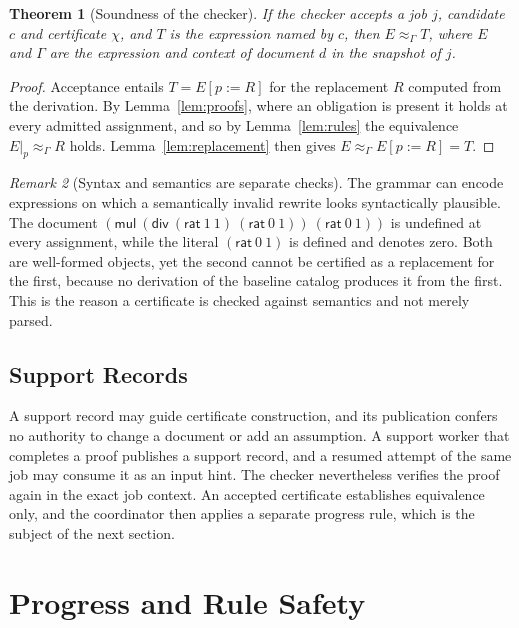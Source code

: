 \documentclass[11pt,a4paper]{article}
\theoremstyle{plain}
\newtheorem{theorem}{Theorem}[section]
\theoremstyle{definition}
\theoremstyle{remark}
\newtheorem{remark}[theorem]{Remark}
\theoremstyle{definition}
\newcommand{\eqv}[1]{\approx_{#1}}
\newcommand{\replace}[3]{#1[#2 \mathbin{:=} #3]}
\begin{document}
\begin{theorem}[Soundness of the checker]
\label{thm:checker}
If the checker accepts a job $j$, candidate $c$ and certificate $\chi$, and $T$ is the expression named by $c$, then $E \eqv{\Gamma} T$, where $E$ and $\Gamma$ are the expression and context of document $d$ in the snapshot of $j$.
\end{theorem}

\begin{proof}
Acceptance entails $T = \replace{E}{p}{R}$ for the replacement $R$ computed from the derivation. By Lemma~\ref{lem:proofs}, where an obligation is present it holds at every admitted assignment, and so by Lemma~\ref{lem:rules} the equivalence $E|_p \eqv{\Gamma} R$ holds. Lemma~\ref{lem:replacement} then gives $E \eqv{\Gamma} \replace{E}{p}{R} = T$.
\end{proof}

\begin{remark}[Syntax and semantics are separate checks]
The grammar can encode expressions on which a semantically invalid rewrite looks syntactically plausible. The document $(\mathsf{mul}\ (\mathsf{div}\ (\mathsf{rat}\ 1\ 1)\ (\mathsf{rat}\ 0\ 1))\ (\mathsf{rat}\ 0\ 1))$ is undefined at every assignment, while the literal $(\mathsf{rat}\ 0\ 1)$ is defined and denotes zero. Both are well-formed objects, yet the second cannot be certified as a replacement for the first, because no derivation of the baseline catalog produces it from the first. This is the reason a certificate is checked against semantics and not merely parsed.
\end{remark}

\subsection{Support Records}

A support record may guide certificate construction, and its publication confers no authority to change a document or add an assumption. A support worker that completes a proof publishes a support record, and a resumed attempt of the same job may consume it as an input hint. The checker nevertheless verifies the proof again in the exact job context. An accepted certificate establishes equivalence only, and the coordinator then applies a separate progress rule, which is the subject of the next section.

\section{Progress and Rule Safety}
\label{sec:progress}
\end{document}
